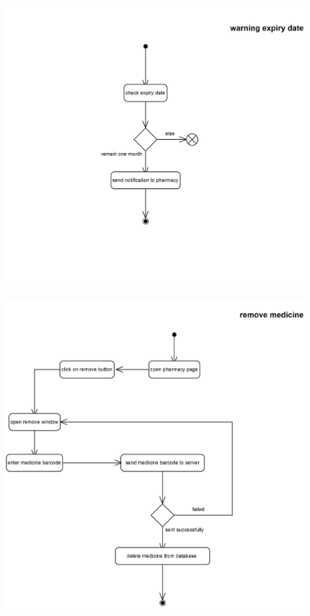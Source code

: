 \documentclass[]{article}
\begin{document}
\begin{figure}[H]
\centering
\includegraphics[scale=0.6]{./activity/18}
\end{figure}
\begin{figure}[H]
\centering
\includegraphics[scale=0.6]{./activity/19}
\end{figure}
\end{document}
